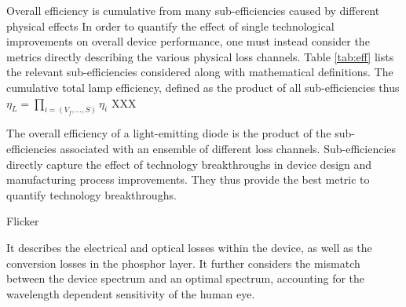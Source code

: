 \documentclass[a4paper,nocompress]{spie}  %
\begin{document}
Overall efficiency is cumulative from many sub-efficiencies caused by different physical effects \cite{schubert2018light}
In order to quantify the effect of single technological improvements on overall device performance, one must instead consider the metrics directly describing the various physical loss channels. Table \ref{tab:eff} lists the relevant sub-efficiencies considered along with mathematical definitions. The cumulative total lamp efficiency, defined as the product of all sub-efficiencies thus $\eta_L = \prod_{i=(V_f,\dots,S)} \eta_i$ XXX

The overall efficiency of a light-emitting diode is the product of the sub-efficiencies associated with an ensemble of different loss channels. Sub-efficiencies directly capture the effect of technology breakthroughs in device design and manufacturing process improvements. They thus provide the best metric to quantify technology breakthroughs.

Flicker \cite{weinold2020long}

        It describes the electrical and optical losses within the device, as well as the conversion losses in the phosphor layer. It further considers the mismatch between the device spectrum and an optimal spectrum, accounting for the wavelength dependent sensitivity of the human eye.
\end{document}
